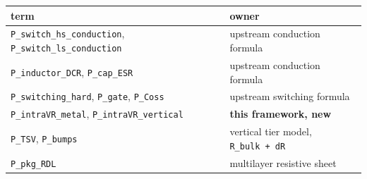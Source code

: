 \documentclass[10pt,]{article}
\begin{document}
\begin{longtable}[]{@{}ll@{}}
\toprule
\begin{minipage}[b]{0.47\columnwidth}\raggedright
term\strut
\end{minipage} & \begin{minipage}[b]{0.47\columnwidth}\raggedright
owner\strut
\end{minipage}\tabularnewline
\midrule
\endhead
\begin{minipage}[t]{0.47\columnwidth}\raggedright
\texttt{P\_switch\_hs\_conduction},
\texttt{P\_switch\_ls\_conduction}\strut
\end{minipage} & \begin{minipage}[t]{0.47\columnwidth}\raggedright
upstream conduction formula\strut
\end{minipage}\tabularnewline
\begin{minipage}[t]{0.47\columnwidth}\raggedright
\texttt{P\_inductor\_DCR}, \texttt{P\_cap\_ESR}\strut
\end{minipage} & \begin{minipage}[t]{0.47\columnwidth}\raggedright
upstream conduction formula\strut
\end{minipage}\tabularnewline
\begin{minipage}[t]{0.47\columnwidth}\raggedright
\texttt{P\_switching\_hard}, \texttt{P\_gate}, \texttt{P\_Coss}\strut
\end{minipage} & \begin{minipage}[t]{0.47\columnwidth}\raggedright
upstream switching formula\strut
\end{minipage}\tabularnewline
\begin{minipage}[t]{0.47\columnwidth}\raggedright
\texttt{P\_intraVR\_metal}, \texttt{P\_intraVR\_vertical}\strut
\end{minipage} & \begin{minipage}[t]{0.47\columnwidth}\raggedright
\textbf{this framework, new}\strut
\end{minipage}\tabularnewline
\begin{minipage}[t]{0.47\columnwidth}\raggedright
\texttt{P\_TSV}, \texttt{P\_bumps}\strut
\end{minipage} & \begin{minipage}[t]{0.47\columnwidth}\raggedright
vertical tier model, \texttt{R\_bulk\ +\ dR}\strut
\end{minipage}\tabularnewline
\begin{minipage}[t]{0.47\columnwidth}\raggedright
\texttt{P\_pkg\_RDL}\strut
\end{minipage} & \begin{minipage}[t]{0.47\columnwidth}\raggedright
multilayer resistive sheet\strut
\end{minipage}\tabularnewline
\bottomrule
\end{longtable}
\end{document}
